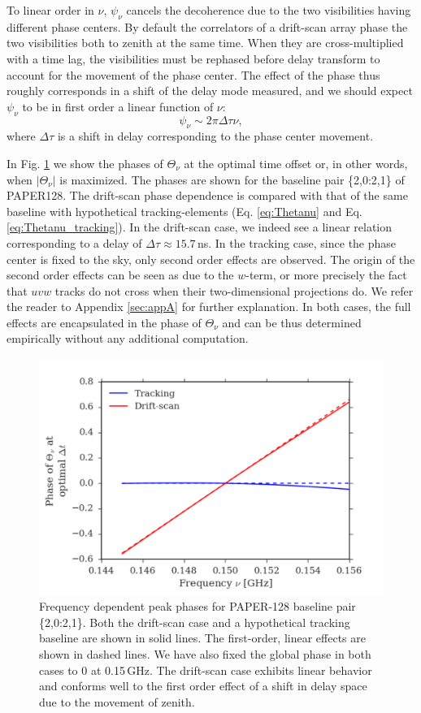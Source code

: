 \documentclass[twocolumn,apj,numberedappendix]{emulateapj}
\renewcommand\[{\begin{equation}}
\renewcommand\]{\end{equation}}
\begin{document}
To linear order in $\nu$, $\psi_\nu$ cancels the decoherence due to the two visibilities having different phase centers. By default the correlators of a drift-scan array phase the two visibilities both to zenith at the same time. When they are cross-multiplied with a time lag, the visibilities must be rephased before delay transform to account for the movement of the phase center. The effect of the phase thus roughly corresponds in a shift of the delay mode measured, and we should expect $\psi_{\nu}$ to be in first order a linear function of $\nu$:
\[
\psi_{\nu}\sim 2\pi\Delta\tau\nu,
\]
where $\Delta\tau$ is a shift in delay corresponding to the phase center movement. 

In Fig. \ref{fig:phi_nu} we show the phases of $\Theta_\nu$ at the optimal time offset or, in other words, when $|\Theta_\nu|$ is maximized. The phases are shown for the baseline pair \{2,0:2,1\} of PAPER128. The drift-scan phase dependence is compared with that of the same baseline with hypothetical tracking-elements (Eq. \eqref{eq:Thetanu} and Eq. \eqref{eq:Thetanu_tracking}). In the drift-scan case, we indeed see a linear relation corresponding to a delay of $\Delta\tau\approx15.7$\,ns. In the tracking case, since the phase center is fixed to the sky, only second order effects are observed. The origin of the second order effects can be seen as due to the $w$-term, or more precisely the fact that $uvw$ tracks do not cross when their two-dimensional projections do. We refer the reader to Appendix \ref{sec:appA} for further explanation. In both cases, the full effects are encapsulated in the phase of $\Theta_\nu$ and can be thus determined empirically without any additional computation. 

\begin{figure}[H]
\includegraphics[width=1\linewidth]{phi_nu}

\caption{Frequency dependent peak phases for PAPER-128 baseline pair \{2,0:2,1\}. Both the drift-scan case and a hypothetical tracking baseline are shown in solid lines. The first-order, linear effects are shown in dashed lines. We have also fixed the global phase in both cases to 0 at 0.15\,GHz. The drift-scan case exhibits linear behavior and conforms well to the first order effect of a shift in delay space due to the movement of zenith. }
\label{fig:phi_nu}
\end{figure}
\end{document}

